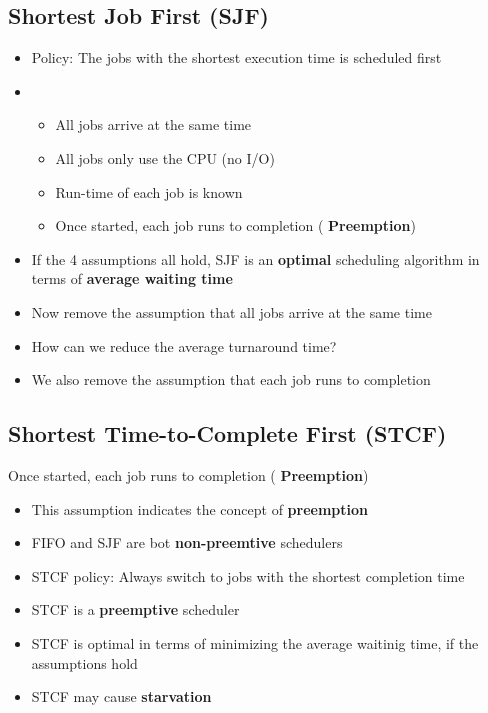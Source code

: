 \documentclass[a4paper,11pt,english]{article}
\begin{document}
\subsection*{Shortest Job First (SJF)}
\begin{itemize}
    \item Policy: The jobs with the shortest execution time is scheduled first
    \item 
        \begin{itemize}
            \item All jobs arrive at the same time
            \item All jobs only use the CPU (no I/O)
            \item Run-time of each job is known
            \item Once started, each job runs to completion (\textbf{\color{blue} Preemption})
        \end{itemize}
    \item If the 4 assumptions all hold, SJF is an \textbf{\color{blue} optimal} scheduling algorithm in terms of \textbf{\color{blue} average waiting time}
    \newline
    \item Now remove the assumption that all jobs arrive at the same time
    \item How can we reduce the average turnaround time?
    \item We also remove the assumption that each job runs to completion 
\end{itemize}

\subsection*{Shortest Time-to-Complete First (STCF)}
\begin{tcolorbox}[colback=blue!15!white, colframe=white!50!blue]
    \begin{center}
        Once started, each job runs to completion (\textbf{\color{blue} Preemption})
    \end{center}
\end{tcolorbox}
\begin{itemize}
    \item This assumption indicates the concept of \textbf{\color{blue} preemption}
    \item FIFO and SJF are bot \textbf{\color{blue} non-preemtive} schedulers
    \item STCF policy: Always switch to jobs with the shortest completion time
    \item STCF is a \textbf{\color{blue} preemptive} scheduler
    \item STCF is optimal in terms of minimizing the average waitinig time, if the assumptions hold
    \item STCF may cause \textbf{\color{red} starvation} 
\end{itemize}
\end{document}
